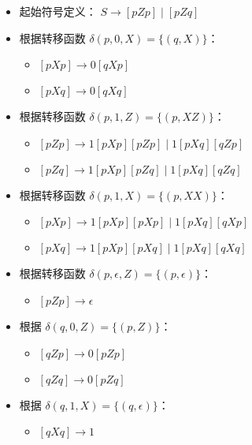 \documentclass{article}
\begin{document}
	\begin{itemize}
		\item 起始符号定义：
		$ S \rightarrow [pZp] \mid [pZq] $
		
		\item 根据转移函数 $\delta(p, 0, X) = \{(q, X)\}$：
		\begin{itemize}
			\item $[pXp] \rightarrow 0[qXp]$
			\item $[pXq] \rightarrow 0[qXq]$
		\end{itemize}
		
		\item 根据转移函数 $\delta(p, 1, Z) = \{(p, XZ)\}$：
		\begin{itemize}
			\item $[pZp] \rightarrow 1[pXp][pZp] \mid 1[pXq][qZp]$
			\item $[pZq] \rightarrow 1[pXp][pZq] \mid 1[pXq][qZq]$
		\end{itemize}
		
		\item 根据转移函数 $\delta(p, 1, X) = \{(p, XX)\}$：
		\begin{itemize}
			\item $[pXp] \rightarrow 1[pXp][pXp] \mid 1[pXq][qXp]$
			\item $[pXq] \rightarrow 1[pXp][pXq] \mid 1[pXq][qXq]$
		\end{itemize}
		
		\item 根据转移函数 $\delta(p, \epsilon, Z) = \{(p, \epsilon)\}$：
		\begin{itemize}
			\item $[pZp] \rightarrow \epsilon$
		\end{itemize}
		
		\item 根据 $\delta(q, 0, Z) = \{(p, Z)\}$：
		\begin{itemize}
			\item $[qZp] \rightarrow 0[pZp]$
			\item $[qZq] \rightarrow 0[pZq]$
		\end{itemize}
		
		\item 根据 $\delta(q, 1, X) = \{(q, \epsilon)\}$：
		\begin{itemize}
			\item $[qXq] \rightarrow 1$
		\end{itemize}
	\end{itemize}
	
\end{document}
